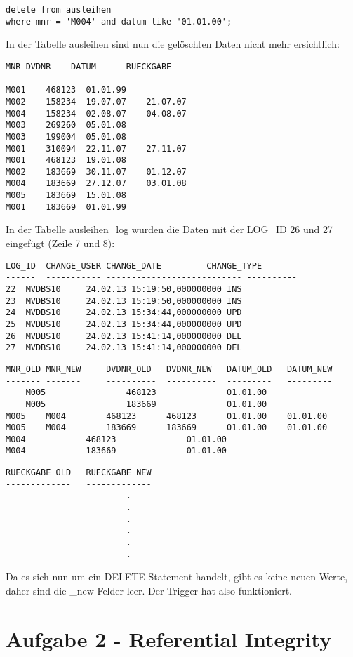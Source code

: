 \documentclass[11pt,a4paper,parskip=half]{scrartcl}
\begin{document}
\begin{lstlisting}
delete from ausleihen
where mnr = 'M004' and datum like '01.01.00';
\end{lstlisting}

In der Tabelle ausleihen sind nun die gelöschten Daten nicht mehr ersichtlich:

\begin{lstlisting}
MNR	DVDNR	 DATUM		RUECKGABE
---- 	------	-------- 	---------
M001	468123 	01.01.99	
M002	158234 	19.07.07	21.07.07  
M004	158234 	02.08.07	04.08.07  
M003	269260 	05.01.08	
M003	199004 	05.01.08	
M001	310094 	22.11.07	27.11.07  
M001	468123 	19.01.08	
M002	183669 	30.11.07	01.12.07  
M004	183669 	27.12.07	03.01.08  
M005	183669 	15.01.08	
M001	183669 	01.01.99	
\end{lstlisting}

In der Tabelle ausleihen\_log wurden die Daten mit der LOG\_ID 26 und 27 eingefügt (Zeile 7 und 8):

\begin{lstlisting}
LOG_ID	CHANGE_USER	CHANGE_DATE			CHANGE_TYPE	
------	-----------	---------------------------	----------		
22	MVDBS10		24.02.13 15:19:50,000000000	INS					
23	MVDBS10		24.02.13 15:19:50,000000000	INS					
24	MVDBS10		24.02.13 15:34:44,000000000	UPD					
25	MVDBS10		24.02.13 15:34:44,000000000	UPD					
26	MVDBS10		24.02.13 15:41:14,000000000	DEL					
27	MVDBS10		24.02.13 15:41:14,000000000	DEL					
\end{lstlisting}

\begin{lstlisting}
MNR_OLD	MNR_NEW		DVDNR_OLD	DVDNR_NEW	DATUM_OLD	DATUM_NEW	
-------	-------		----------	----------	---------	--------- 	
	M005				468123				01.01.00					
	M005				183669				01.01.00					
M005	M004		468123		468123		01.01.00	01.01.00				
M005	M004		183669		183669		01.01.00	01.01.00				
M004			468123				01.01.00					
M004			183669				01.01.00					
\end{lstlisting}
\begin{lstlisting}
RUECKGABE_OLD	RUECKGABE_NEW
-------------	-------------	
						.
						.
						.
						.
						.
						.
\end{lstlisting}

Da es sich nun um ein DELETE-Statement handelt, gibt es keine neuen Werte, daher sind die \_new Felder leer. Der Trigger hat also funktioniert.

\section{Aufgabe 2 - Referential Integrity}
\end{document}
